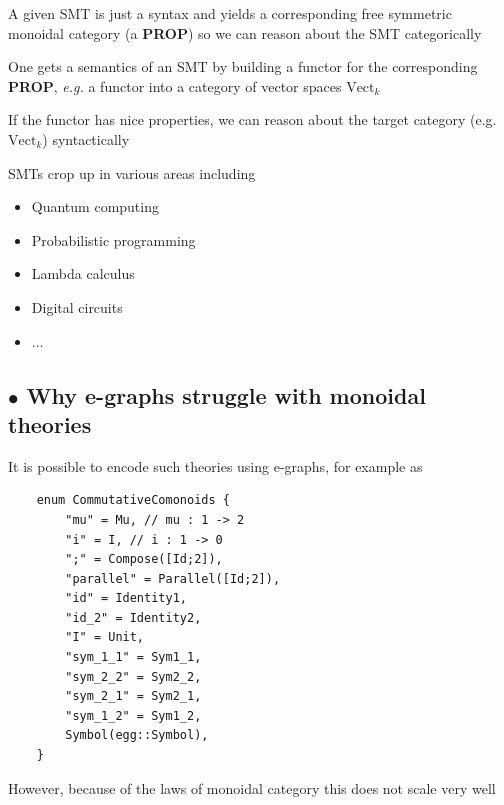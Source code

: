 \documentclass[aspectratio=169]{beamer}
\newcommand{\bsubsection}[1]{\subsection{$\bullet$ #1}}
\begin{document}
\begin{frame}
    \vfill
    A given SMT is just a syntax and yields a corresponding free symmetric monoidal category (a \textbf{PROP}) so we can reason about the SMT categorically

    \vfill

    One gets a semantics of an SMT by building a functor for the corresponding \textbf{PROP}, \textit{e.g.} a functor into a category of vector spaces \textbf{$\text{Vect}_{k}$}

    \vfill

    If the functor has nice properties, we can reason about the target category (e.g. \textbf{$\text{Vect}_{k}$}) syntactically
\end{frame}

\begin{frame}
    SMTs crop up in various areas including
    \begin{itemize}
        \item Quantum computing
        \item Probabilistic programming
        \item Lambda calculus
        \item Digital circuits
        \item $\ldots$
    \end{itemize}
\end{frame}

\bsubsection{Why e-graphs struggle with monoidal theories}

\begin{frame}[containsverbatim]{}

It is possible to encode such theories using e-graphs, for example as

\begin{verbatim}
    enum CommutativeComonoids {
        "mu" = Mu, // mu : 1 -> 2
        "i" = I, // i : 1 -> 0
        ";" = Compose([Id;2]),
        "parallel" = Parallel([Id;2]),
        "id" = Identity1,
        "id_2" = Identity2,
        "I" = Unit,
        "sym_1_1" = Sym1_1,
        "sym_2_2" = Sym2_2,
        "sym_2_1" = Sym2_1,
        "sym_1_2" = Sym1_2,
        Symbol(egg::Symbol),
    }
\end{verbatim}



\end{frame}

\begin{frame}
    However, because of the laws of monoidal category this does not scale very well
\end{frame}
\end{document}
